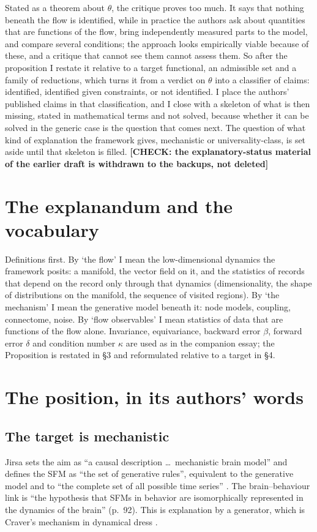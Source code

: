 \documentclass[10pt]{article}
\newcommand{\CHECK}[1]{\textcolor{purple!70!black}{\textbf{[CHECK: #1]}}}
\begin{document}
Stated as a theorem about $\theta$, the critique proves too much. It says that nothing beneath the flow is identified, while in practice the authors ask about quantities that are functions of the flow, bring independently measured parts to the model, and compare several conditions; the approach looks empirically viable because of these, and a critique that cannot see them cannot assess them. So after the proposition I restate it relative to a target functional, an admissible set and a family of reductions, which turns it from a verdict on $\theta$ into a classifier of claims: identified, identified given constraints, or not identified. I place the authors' published claims in that classification, and I close with a skeleton of what is then missing, stated in mathematical terms and not solved, because whether it can be solved in the generic case is the question that comes next. The question of what kind of explanation the framework gives, mechanistic or universality-class, is set aside until that skeleton is filled. \CHECK{the explanatory-status material of the earlier draft is withdrawn to the backups, not deleted}

\section{The explanandum and the vocabulary}
Definitions first. By `the flow' I mean the low-dimensional dynamics the framework posits: a manifold, the vector field on it, and the statistics of records that depend on the record only through that dynamics (dimensionality, the shape of distributions on the manifold, the sequence of visited regions). By `the mechanism' I mean the generative model beneath it: node models, coupling, connectome, noise. By `flow observables' I mean statistics of data that are functions of the flow alone. Invariance, equivariance, backward error $\beta$, forward error $\delta$ and condition number $\kappa$ are used as in the companion essay; the Proposition is restated in \S3 and reformulated relative to a target in \S4.

\section{The position, in its authors' words}
\subsection{The target is mechanistic}
Jirsa sets the aim as ``a causal description \ldots\ mechanistic brain model'' and defines the SFM as ``the set of generative rules'', equivalent to the generative model and to ``the complete set of all possible time series'' \parencite[pp.~89, 92]{jirsa2020}. The brain--behaviour link is ``the hypothesis that SFMs in behavior are isomorphically represented in the dynamics of the brain'' (p.~92). This is explanation by a generator, which is Craver's mechanism in dynamical dress \parencite{kaplan2011}.
\end{document}
